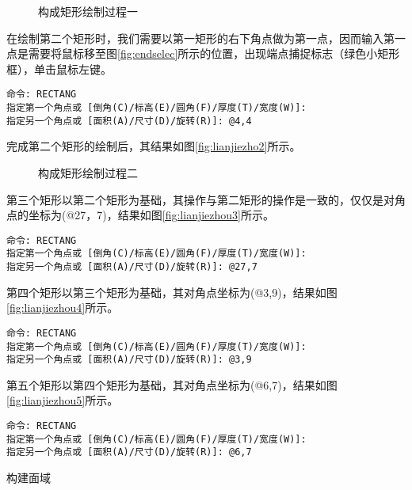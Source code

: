\begin{procedure}
\begin{figure}[htbp]
\centering
{}\hspace{20pt}
\hspace{20pt}
\caption{构成矩形绘制过程一}
\end{figure}

在绘制第二个矩形时，我们需要以第一矩形的右下角点做为第一点，因而输入第一点是需要将鼠标移至图\ref{fig:endselec}所示的位置，出现端点捕捉标志（绿色小矩形框），单击鼠标左键。
\begin{lstlisting}
命令: RECTANG
指定第一个角点或 [倒角(C)/标高(E)/圆角(F)/厚度(T)/宽度(W)]:
指定另一个角点或 [面积(A)/尺寸(D)/旋转(R)]: @4,4
\end{lstlisting}

完成第二个矩形的绘制后，其结果如图\ref{fig:lianjiezho2}所示。
\begin{figure}[htbp]
\centering
{}\hspace{20pt}
\caption{构成矩形绘制过程二}
\end{figure}

第三个矩形以第二个矩形为基础，其操作与第二矩形的操作是一致的，仅仅是对角点的坐标为(@27，7)，结果如图\ref{fig:lianjiezhou3}所示。
\begin{lstlisting}
命令: RECTANG
指定第一个角点或 [倒角(C)/标高(E)/圆角(F)/厚度(T)/宽度(W)]:
指定另一个角点或 [面积(A)/尺寸(D)/旋转(R)]: @27,7
\end{lstlisting}

第四个矩形以第三个矩形为基础，其对角点坐标为(@3,9)，结果如图\ref{fig:lianjiezhou4}所示。
\begin{lstlisting}
命令: RECTANG
指定第一个角点或 [倒角(C)/标高(E)/圆角(F)/厚度(T)/宽度(W)]:
指定另一个角点或 [面积(A)/尺寸(D)/旋转(R)]: @3,9
\end{lstlisting}

第五个矩形以第四个矩形为基础，其对角点坐标为(@6,7)，结果如图\ref{fig:lianjiezhou5}所示。
\begin{lstlisting}
命令: RECTANG
指定第一个角点或 [倒角(C)/标高(E)/圆角(F)/厚度(T)/宽度(W)]:
指定另一个角点或 [面积(A)/尺寸(D)/旋转(R)]: @6,7
\end{lstlisting}
\item 构建面域


\end{procedure}
